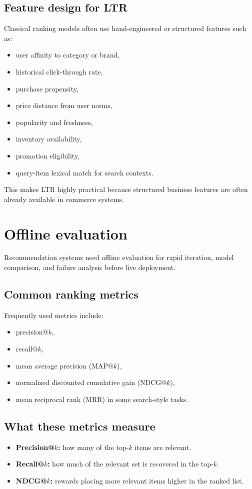 \subsection{Feature design for LTR}
Classical ranking models often use hand-engineered or structured features such as:
\begin{itemize}
  \item user affinity to category or brand,
  \item historical click-through rate,
  \item purchase propensity,
  \item price distance from user norms,
  \item popularity and freshness,
  \item inventory availability,
  \item promotion eligibility,
  \item query-item lexical match for search contexts.
\end{itemize}

This makes LTR highly practical because structured business features are often already available in commerce systems.

\section{Offline evaluation}
Recommendation systems need offline evaluation for rapid iteration, model comparison, and failure analysis before live deployment.

\subsection{Common ranking metrics}
Frequently used metrics include:
\begin{itemize}
  \item precision@$k$,
  \item recall@$k$,
  \item mean average precision (MAP@$k$),
  \item normalized discounted cumulative gain (NDCG@$k$),
  \item mean reciprocal rank (MRR) in some search-style tasks.
\end{itemize}

\subsection{What these metrics measure}
\begin{itemize}
  \item \textbf{Precision@$k$:} how many of the top-$k$ items are relevant.
  \item \textbf{Recall@$k$:} how much of the relevant set is recovered in the top-$k$.
  \item \textbf{NDCG@$k$:} rewards placing more relevant items higher in the ranked list.
\end{itemize}

